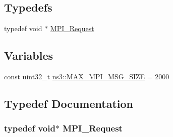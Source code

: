 \subsection*{Typedefs}
\begin{DoxyCompactItemize}
\item 
typedef void $\ast$ \hyperlink{granted-time-window-mpi-interface_8h_a31b372fd1cca939295900acb2a4961dd}{M\+P\+I\+\_\+\+Request}
\end{DoxyCompactItemize}
\subsection*{Variables}
\begin{DoxyCompactItemize}
\item 
const uint32\+\_\+t \hyperlink{namespacens3_acc821d14dfe483841d1f00caadad96d5}{ns3\+::\+M\+A\+X\+\_\+\+M\+P\+I\+\_\+\+M\+S\+G\+\_\+\+S\+I\+ZE} = 2000
\end{DoxyCompactItemize}


\subsection{Typedef Documentation}
\subsubsection[{\texorpdfstring{M\+P\+I\+\_\+\+Request}{MPI_Request}}]{\setlength{\rightskip}{0pt plus 5cm}typedef void$\ast$ {\bf M\+P\+I\+\_\+\+Request}}\hypertarget{granted-time-window-mpi-interface_8h_a31b372fd1cca939295900acb2a4961dd}{}\label{granted-time-window-mpi-interface_8h_a31b372fd1cca939295900acb2a4961dd}
